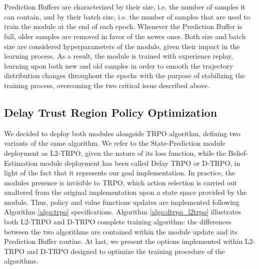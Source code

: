                 \\\\
                Prediction Buffers are characterized by their size, i.e. the number of samples it can contain, and by their batch size, i.e. the number of samples that are used to train the module at the end of each epoch. Whenever the Prediction Buffer is full, older samples are removed in favor of the newer ones. Both size and batch size are considered hyperparameters of the module, given their impact in the learning process. As a result, the module is trained with experience replay, learning upon both new and old samples in order to smooth the trajectory distribution changes throughout the epochs with the purpose of stabilizing the training process, overcoming the two critical issue described above.
                
        \subsection{Delay Trust Region Policy Optimization}
        \label{sub:dtrpo}
            
            We decided to deploy both modules alongside TRPO algorithm, defining two variants of the same algorithm. We refer to the State-Prediction module deployment as L2-TRPO, given the nature of its loss function, while the Belief-Estimation module deployment has been called Delay TRPO or D-TRPO, in light of the fact that it represents our goal implementation. In practice, the modules presence is invisible to TRPO, which action selection is carried out unaltered from the original implementation upon a state space provided by the module. Thus, policy and value functions updates are implemented following Algorithm \ref{algo:trpo} specifications. Algorithm \ref{algo:dtrpo_l2trpo} illustrates both L2-TRPO and D-TRPO complete training algorithm: the differences between the two algorithms are contained within the module update and its Prediction Buffer routine. At last, we present the options implemented within L2-TRPO and D-TRPO designed to optimize the training procedure of the algorithms.
            
